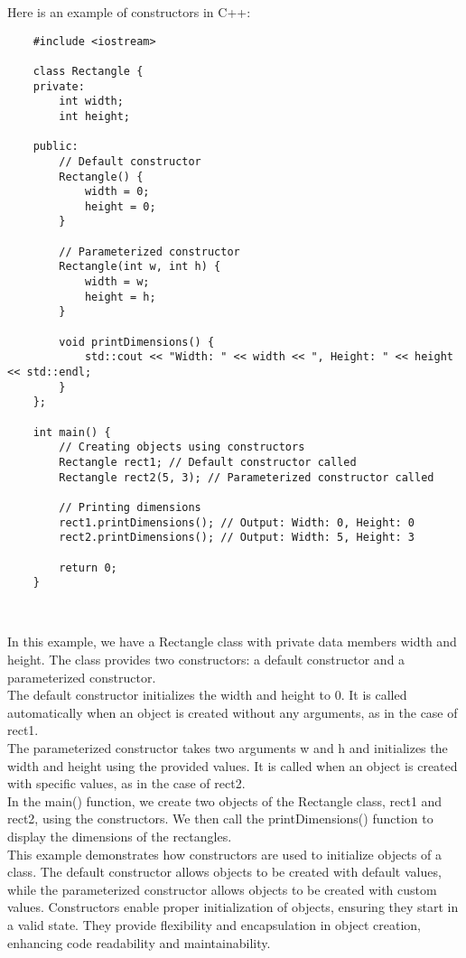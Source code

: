 \begin{solution}
    Here is an example of constructors in C++: \\
    \horizontalline
    \begin{verbatim}
    #include <iostream>

    class Rectangle {
    private:
        int width;
        int height;
    
    public:
        // Default constructor
        Rectangle() {
            width = 0;
            height = 0;
        }
    
        // Parameterized constructor
        Rectangle(int w, int h) {
            width = w;
            height = h;
        }
    
        void printDimensions() {
            std::cout << "Width: " << width << ", Height: " << height << std::endl;
        }
    };
    
    int main() {
        // Creating objects using constructors
        Rectangle rect1; // Default constructor called
        Rectangle rect2(5, 3); // Parameterized constructor called
    
        // Printing dimensions
        rect1.printDimensions(); // Output: Width: 0, Height: 0
        rect2.printDimensions(); // Output: Width: 5, Height: 3
    
        return 0;
    }        
    \end{verbatim} \\
    \horizontalline

    In this example, we have a Rectangle class with private data members width and height. The class provides two constructors: a default constructor and a parameterized constructor. \\

    \noindent The default constructor initializes the width and height to 0. It is called automatically when an object is created without any arguments, as in the case of rect1. \\

    \noindent The parameterized constructor takes two arguments w and h and initializes the width and height using the provided values. It is called when an object is created with specific values, 
    as in the case of rect2. \\

    \noindent In the main() function, we create two objects of the Rectangle class, rect1 and rect2, using the constructors. We then call the printDimensions() function to display the dimensions 
    of the rectangles. \\

    \noindent This example demonstrates how constructors are used to initialize objects of a class. The default constructor allows objects to be created with default values, while the parameterized constructor 
    allows objects to be created with custom values. Constructors enable proper initialization of objects, ensuring they start in a valid state. They provide flexibility and encapsulation in object 
    creation, enhancing code readability and maintainability. \\
\end{solution}

